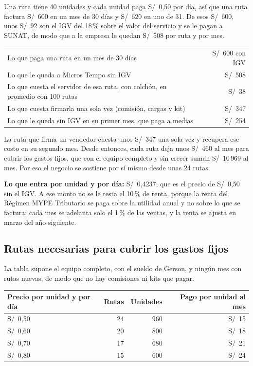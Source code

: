 \documentclass[10.5pt,a4paper]{article}
\begin{document}
Una ruta tiene 40 unidades y cada unidad paga S/~0,50 por día, así que una ruta factura S/~600 en un mes de 30 días y S/~620 en uno de 31. De esos S/~600, unos S/~92 son el IGV del 18\,\% sobre el valor del servicio y se le pagan a SUNAT, de modo que a la empresa le quedan S/~508 por ruta y por mes.

\begin{center}
\begin{tabularx}{0.86\linewidth}{@{}Xr@{}}
\toprule
Lo que paga una ruta en un mes de 30 días & S/~600 con IGV\\
Lo que le queda a Micros Tempo sin IGV & S/~508\\
Lo que cuesta el servidor de esa ruta, con colchón, en promedio con 100 rutas & S/~38\\
Lo que cuesta firmarla una sola vez (comisión, cargas y kit) & S/~347\\
Lo que le queda sin IGV en su primer mes, que paga a medias & S/~254\\
\bottomrule
\end{tabularx}
\end{center}

La ruta que firma un vendedor cuesta unos S/~347 una sola vez y recupera ese costo en su segundo mes. Desde entonces, cada ruta deja unos S/~460 al mes para cubrir los gastos fijos, que con el equipo completo y sin crecer suman S/~10\,969 al mes. Por eso el negocio se sostiene por sí mismo desde unas 24 rutas.

\begin{nota}
\textbf{Lo que entra por unidad y por día:} S/~0,4237, que es el precio de S/~0,50 sin el IGV. A ese monto no se le resta el 10\,\% de renta, porque la renta del Régimen MYPE Tributario se paga sobre la utilidad anual y no sobre lo que se factura: cada mes se adelanta solo el 1\,\% de las ventas, y la renta se ajusta en marzo del año siguiente.
\end{nota}

\subsection{Rutas necesarias para cubrir los gastos fijos}

La tabla supone el equipo completo, con el sueldo de Gerson, y ningún mes con rutas nuevas, de modo que no hay comisiones ni kits que pagar.

\begin{center}
\begin{tabular}{@{}lrrr@{}}
\toprule
Precio por unidad y por día & Rutas & Unidades & Pago por unidad al mes\\
\midrule
S/~0,50 & 24 & 960 & S/~15 \\
S/~0,60 & 20 & 800 & S/~18 \\
S/~0,70 & 17 & 680 & S/~21 \\
S/~0,80 & 15 & 600 & S/~24 \\
\bottomrule
\end{tabular}
\end{center}
\end{document}
